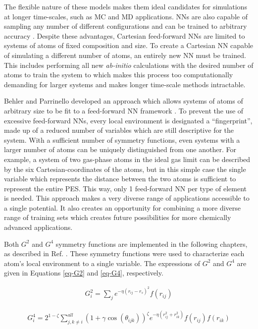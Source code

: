 \documentclass[12pt,oneside]{cmuthesis}
\begin{document}
The flexible nature of these models makes them ideal candidates for simulations at longer time-scales, such as MC and MD applications. NNs are also capable of sampling any number of different configurations and can be trained to arbitrary accuracy \cite{hornik-1989-multil}. Despite these advantages, Cartesian feed-forward NNs are limited to systems of atoms of fixed composition and size. To create a Cartesian NN capable of simulating a different number of atoms, an entirely new NN must be trained. This includes performing all new \emph{ab-initio} calculations with the desired number of atoms to train the system to which makes this process too computationally demanding for larger systems and makes longer time-scale methods intractable.

Behler and Parrinello developed an approach which allows systems of atoms of arbitrary size to be fit to a feed-forward NN framework \cite{behler-2007-gener-neural}. To prevent the use of excessive feed-forward NNs, every local environment is designated a ``fingerprint'', made up of a reduced number of variables which are still descriptive for the system. With a sufficient number of symmetry functions, even systems with a larger number of atoms can be uniquely distinguished from one another. For example, a system of two gas-phase atoms in the ideal gas limit can be described by the six Cartesian-coordinates of the atoms, but in this simple case the single variable which represents the distance between the two atoms is sufficient to represent the entire PES. This way, only 1 feed-forward NN per type of element is needed. This approach makes a very diverse range of applications accessible to a single potential. It also creates an opportunity for combining a more diverse range of training sets which creates future possibilities for more chemically advanced applications.

Both \(G^{2}\) and \(G^{4}\) symmetry functions are implemented in the following chapters, as described in Ref. . These symmetry functions were used to characterize each atom's local environment to a single variable. The expressions of \(G^{2}\) and \(G^{4}\) are given in Equations \ref{eq-G2} and \ref{eq-G4}, respectively.

\begin{eqnarray} \label{eq-G2}
G_{i}^{2} = \sum_{j}e^{-\eta(r_{ij} - r_{s})^2} f(r_{ij})
\end{eqnarray}

\begin{eqnarray} \label{eq-G4}
G_{i}^{4} = 2^{1-\zeta} \sum^{all}_{j,k \neq i} (1 + \gamma \cos\left(\theta_{ijk}\right))^{\zeta} e^{-\eta(r^{2}_{ij}+r_{ik}^2)} f(r_{ij}) f(r_{ik})
\end{eqnarray}
\end{document}
